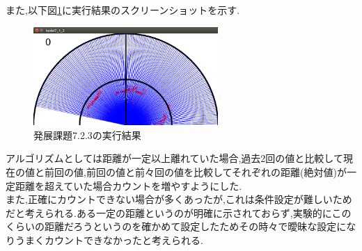 \documentclass{jarticle}
\begin{document}
また,以下図\ref{fig:hatten7-2-3}に実行結果のスクリーンショットを示す.

\begin{figure}[H]
\begin{center}
\includegraphics[width=7.0cm]{images/hatten7-2-3.png}
\caption{発展課題7.2.3の実行結果}
\label{fig:hatten7-2-3}
\end{center}
\end{figure}
アルゴリズムとしては距離が一定以上離れていた場合,過去2回の値と比較して現在の値と前回の値,前回の値と前々回の値を比較してそれぞれの距離(絶対値)が一定距離を超えていた場合カウントを増やすようにした.\\
また,正確にカウントできない場合が多くあったが,これは条件設定が難しいためだと考えられる.ある一定の距離というのが明確に示されておらず,実験的にこのくらいの距離だろうというのを確かめて設定したためその時々で曖昧な設定になりうまくカウントできなかったと考えられる.
\end{document}
